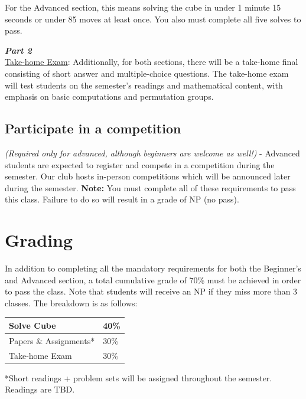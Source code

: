 \documentclass[11pt]{article}
\begin{document}
For the Advanced section, this means solving the cube in under 1 minute 15 seconds or under 85 moves at least once. You also must complete all five solves to pass.

\textit{\textbf{Part 2}} \\
\underline{Take-home Exam}: Additionally, for both sections, there will be a take-home final consisting of short answer and multiple-choice questions.
The take-home exam will test students on the semester’s readings and mathematical content, with emphasis on basic computations and permutation groups.


\subsection*{Participate in a competition}
\textit{(Required only for advanced, although beginners are welcome as well!)} - Advanced students are expected to register and compete in a competition during the semester. Our club hosts in-person competitions which will be announced later during the semester. %
\textbf{Note:} You must complete all of these requirements to pass this class. Failure to do so will result in a grade of NP (no pass).


\section*{Grading}
In addition to completing all the mandatory requirements for both the Beginner’s and Advanced section, a total cumulative grade of 70\% must be achieved in order to pass the class. Note that students will receive an NP if they miss more than 3 classes. The breakdown is as follows:
\begin{center}
\begin{tabular}{|l|l|}
\hline
Solve Cube             & 40\% \\ \hline
Papers \& Assignments* & 30\% \\ \hline
Take-home Exam         & 30\% \\ \hline
\end{tabular}
\end{center}
\begin{footnotesize}
*Short readings + problem sets will be assigned throughout the semester. Readings are TBD. 
\end{footnotesize}
\end{document}
